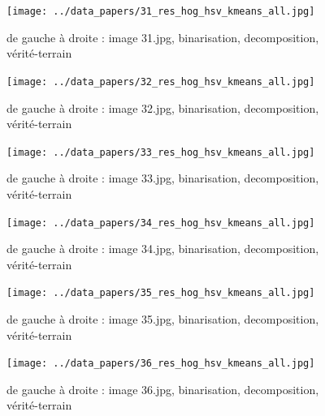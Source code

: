 \documentclass{book}
\begin{document}
\begin{figure}[H]
\begin{center}
\texttt{[image: ../data\_papers/31\_res\_hog\_hsv\_kmeans\_all.jpg]}
\end{center}
\caption{de gauche à droite : image 31.jpg, binarisation, decomposition, vérité-terrain}
\label{31}
\end{figure}
\clearpage


\begin{figure}[H]
\begin{center}
\texttt{[image: ../data\_papers/32\_res\_hog\_hsv\_kmeans\_all.jpg]}
\end{center}
\caption{de gauche à droite : image 32.jpg, binarisation, decomposition, vérité-terrain}
\label{32}
\end{figure}
\clearpage


\begin{figure}[H]
\begin{center}
\texttt{[image: ../data\_papers/33\_res\_hog\_hsv\_kmeans\_all.jpg]}
\end{center}
\caption{de gauche à droite : image 33.jpg, binarisation, decomposition, vérité-terrain}
\label{33}
\end{figure}
\clearpage


\begin{figure}[H]
\begin{center}
\texttt{[image: ../data\_papers/34\_res\_hog\_hsv\_kmeans\_all.jpg]}
\end{center}
\caption{de gauche à droite : image 34.jpg, binarisation, decomposition, vérité-terrain}
\label{34}
\end{figure}
\clearpage


\begin{figure}[H]
\begin{center}
\texttt{[image: ../data\_papers/35\_res\_hog\_hsv\_kmeans\_all.jpg]}
\end{center}
\caption{de gauche à droite : image 35.jpg, binarisation, decomposition, vérité-terrain}
\label{35}
\end{figure}
\clearpage


\begin{figure}[H]
\begin{center}
\texttt{[image: ../data\_papers/36\_res\_hog\_hsv\_kmeans\_all.jpg]}
\end{center}
\caption{de gauche à droite : image 36.jpg, binarisation, decomposition, vérité-terrain}
\label{36}
\end{figure}
\clearpage
\end{document}
